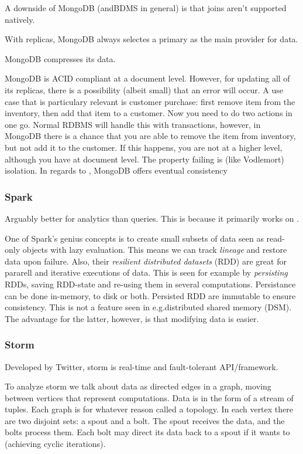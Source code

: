 A downside of MongoDB (andBDMS in general) is that joins
aren't supported natively. 

With replicas, MongoDB always selectes a primary as the main provider for data.

MongoDB compresses its data.

MongoDB is ACID compliant at a document level. However, for updating all of its replicas, 
there is a possibility (albeit small) that an error will occur. A use case that is particulary relevant
is customer purchase: first remove item from the inventory, then add that item to a customer.
Now you need to do two actions in one go. Normal RDBMS will handle this with transactions,
however, in MongoDB there is a chance that you are able to remove the item from inventory, but not add
it to the customer. If this happens, you are not  at a higher level, although you have  at document level. The property failing is (like Vodlemort) isolation.
In regards to , MongoDB offers eventual consistency

\subsubsection{Spark}\label{sec:spark}
Arguably better for analytics than queries. This is because it primarily works on 
.

One of Spark's genius concepts is to create small subsets of data seen as read-only objects with lazy evaluation.
This means we can track \textit{lineage} and restore data upon failure. Also, their \textit{resilient distributed datasets} (RDD) are great for pararell and iterative executions of data.
This is seen for example by \textit{persisting} RDDs, saving RDD-state and re-using them in several computations.
Persistance can be done in-memory, to disk or both. Persisted RDD are immutable to ensure consistency.
This is not a feature seen in e.g.\@ distributed shared memory (DSM). The advantage for the latter, however,
is that modifying data is easier.



\subsubsection{Storm}\label{sec:storm}
Developed by Twitter, storm is real-time and fault-tolerant API/framework.

To analyze storm we talk about data as directed edges in a graph, moving between vertices
that represent computations. Data is in the form of a stream of tuples.
Each graph is for whatever reason called a topology. In each vertex there are
two disjoint sets: a spout and a bolt. The spout receives the data, and the bolts
process them. Each bolt may direct its data back to a spout if it wants to (achieving cyclic iterations).

